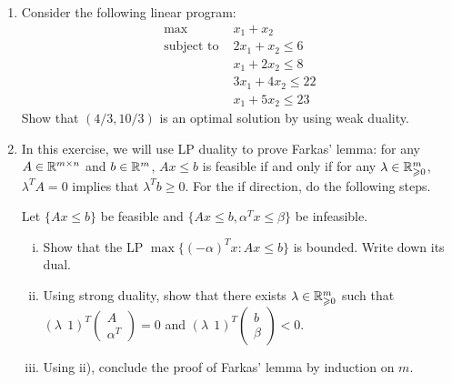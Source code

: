 \documentclass[11pt]{article}
\renewcommand{\leq}{\leqslant}
\renewcommand{\geq}{\geqslant}
\begin{document}
\begin{enumerate}[1)]
\item Consider the following linear program:
\begin{align*}
\max \quad & x_1 + x_2 \\
\text{subject to }&2x_1 + x_2 ≤6 \\
&x_1 + 2x_2 ≤8 \\
& 3x_1 + 4x_2 ≤ 22\\
& x_1 + 5x_2 ≤ 23
\end{align*}
Show that $(4/3, 10/3)$ is an optimal solution by using weak duality.


\item In this exercise, we will use LP duality to prove Farkas' lemma: for any $A\in \mathbb{R}^{m\times n}$ and $b\in \mathbb{R}^m$, $Ax \leq b$ is feasible if and only if for any $\lambda \in \R^m_{\geq 0}$, $\lambda^T A = 0$ implies that $\lambda^T b \geq 0$.
For the if direction, do the following steps. 

Let $\{Ax\leq b\}$ be feasible and $\{Ax\leq b, \alpha^T x\leq \beta\}$ be infeasible.
\begin{enumerate}[i)]
	\item Show that the LP $\max\{(-\alpha)^Tx: Ax\leq b\}$ is bounded. Write down its dual.
	\item Using strong duality, show that there exists $\lambda \in \R^m_{\geq 0}$ such that $(\lambda \;\, 1)^T \begin{pmatrix} A \\ \alpha^T \end{pmatrix} = 0$ and $(\lambda \;\, 1)^T \begin{pmatrix} b \\ \beta \end{pmatrix} < 0$.
	\item Using ii), conclude the proof of Farkas' lemma by induction on $m$.
\end{enumerate}


\end{enumerate}



  
\end{document}
